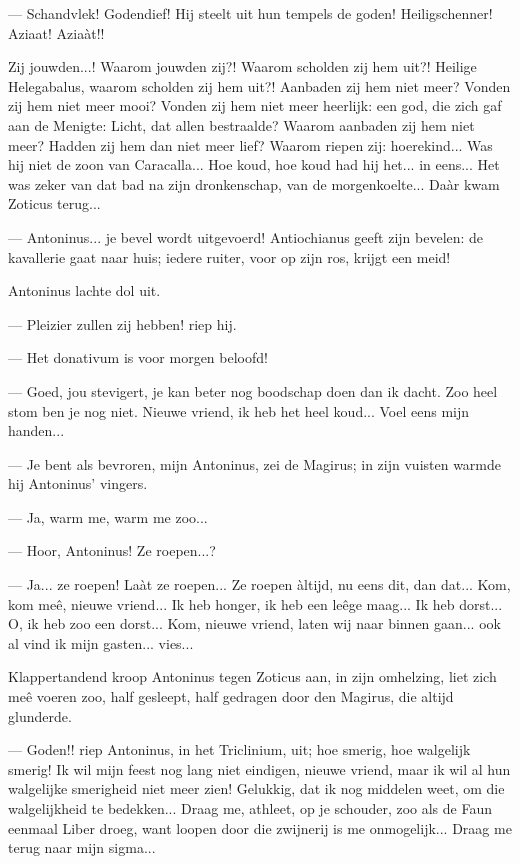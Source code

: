 \documentclass[a4paper, 12pt, oneside, dutch]{article}
\begin{document}
--- Schandvlek! Godendief! Hij steelt uit hun tempels de goden! Heiligschenner! Aziaat! Aziaàt!!

Zij jouwden...! Waarom jouwden zij?! Waarom scholden zij hem uit?! Heilige Helegabalus, waarom scholden zij hem uit?! Aanbaden zij hem niet meer? Vonden zij hem niet meer mooi? Vonden zij hem niet meer heerlijk: een god, die zich gaf aan de Menigte: Licht, dat allen bestraalde? Waarom aanbaden zij hem niet meer? Hadden zij hem dan niet meer lief? Waarom riepen zij: hoerekind... Was hij niet de zoon van Caracalla... Hoe koud, hoe koud had hij het... in eens... Het was zeker van dat bad na zijn dronkenschap, van de morgenkoelte... Daàr kwam Zoticus terug...

--- Antoninus... je bevel wordt uitgevoerd! Antiochianus geeft zijn bevelen: de kavallerie gaat naar huis; iedere ruiter, voor op zijn ros, krijgt een meid!

Antoninus lachte dol uit.

--- Pleizier zullen zij hebben! riep hij.

--- Het donativum is voor morgen beloofd!

--- Goed, jou stevigert, je kan beter nog boodschap doen dan ik dacht. Zoo heel stom ben je nog niet. Nieuwe vriend, ik heb het heel koud... Voel eens mijn handen...

--- Je bent als bevroren, mijn Antoninus, zei de Magirus; in zijn vuisten warmde hij Antoninus' vingers.

--- Ja, warm me, warm me zoo...

--- Hoor, Antoninus! Ze roepen...?

--- Ja... ze roepen! Laàt ze roepen... Ze roepen àltijd, nu eens dit, dan dat... Kom, kom meê, nieuwe vriend... Ik heb honger, ik heb een leêge maag... Ik heb dorst... O, ik heb zoo een dorst... Kom, nieuwe vriend, laten wij naar binnen gaan... ook al vind ik mijn gasten... vies...

Klappertandend kroop Antoninus tegen Zoticus aan, in zijn omhelzing, liet zich meê voeren zoo, half gesleept, half gedragen door den Magirus, die altijd glunderde.

--- Goden!! riep Antoninus, in het Triclinium, uit; hoe smerig, hoe walgelijk smerig! Ik wil mijn feest nog lang niet eindigen, nieuwe vriend, maar ik wil al hun walgelijke smerigheid niet meer zien! Gelukkig, dat ik nog middelen weet, om die walgelijkheid te bedekken... Draag me, athleet, op je schouder, zoo als de Faun eenmaal Liber droeg, want loopen door die zwijnerij is me onmogelijk... Draag me terug naar mijn sigma...
\end{document}
